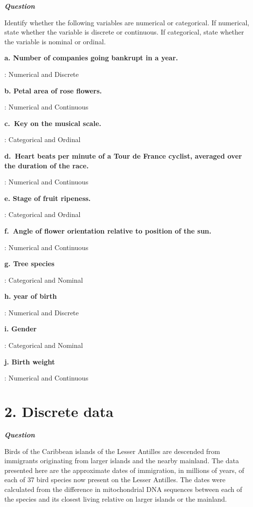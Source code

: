 \documentclass[
  letterpaper,
  DIV=11,
  numbers=noendperiod]{scrreprt}
\begin{document}
\textbf{\emph{Question}}

Identify whether the following variables are numerical or categorical.
If numerical, state whether the variable is discrete or continuous. If
categorical, state whether the variable is nominal or ordinal.

\textbf{a. Number of companies going bankrupt in a year.}

: Numerical and Discrete

\textbf{b. Petal area of rose flowers.}

: Numerical and Continuous

\textbf{c.~Key on the musical scale.}

: Categorical and Ordinal

\textbf{d.~Heart beats per minute of a Tour de France cyclist, averaged
over the duration of the race.}

: Numerical and Continuous

\textbf{e. Stage of fruit ripeness.}

: Categorical and Ordinal

\textbf{f.~Angle of flower orientation relative to position of the sun.}

: Numerical and Continuous

\textbf{g. Tree species}

: Categorical and Nominal

\textbf{h. year of birth}

: Numerical and Discrete

\textbf{i. Gender}

: Categorical and Nominal

\textbf{j. Birth weight}

: Numerical and Continuous

\section*{2. Discrete data}\label{discrete-data}


\textbf{\emph{Question}}

Birds of the Caribbean islands of the Lesser Antilles are descended from
immigrants originating from larger islands and the nearby mainland. The
data presented here are the approximate dates of immigration, in
millions of years, of each of 37 bird species now present on the Lesser
Antilles. The dates were calculated from the difference in mitochondrial
DNA sequences between each of the species and its closest living
relative on larger islands or the mainland.
\end{document}
